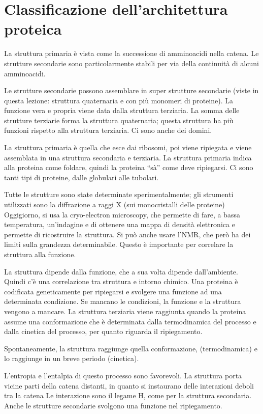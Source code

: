 \chapter{Classificazione dell'architettura proteica}


La struttura primaria è vista come la successione di amminoacidi nella
catena.
Le strutture secondarie sono particolarmente stabili per via della
continuità di alcuni amminoacidi.

Le strutture secondarie possono assemblare in super strutture secondarie
(viste in questa lezione: struttura quaternaria e con più monomeri di
proteine).
La funzione vera e propria viene data dalla struttura terziaria.
La somma delle strutture terziarie forma la struttura quaternaria;
questa struttura ha più funzioni rispetto alla struttura terziaria.
Ci sono anche dei domini.

La struttura primaria è quella che esce dai ribosomi, poi viene
ripiegata e viene assemblata in una struttura secondaria e terziaria.
La struttura primaria indica alla proteina come foldare, quindi la
proteina ``sà'' come deve ripiegarsi.
Ci sono tanti tipi di proteine, dalle globulari alle tubolari.

Tutte le strutture sono state determinate sperimentalmente; gli
strumenti utilizzati sono la diffrazione a raggi X (sui monocristalli
delle proteine)
Oggigiorno, si usa la cryo-electron microscopy, che permette di fare, a
bassa temperatura, un'indagine e di ottenere una mappa di densità
elettronica e permette di ricostruire la struttura.
Si può anche usare l'NMR, che però ha dei limiti sulla grandezza
determinabile.
Questo è importante per correlare la struttura alla funzione.

La struttura dipende dalla funzione, che a sua volta dipende
dall'ambiente. Quindi c'è una correlazione tra struttura e intorno
chimico.
Una proteina è codificata geneticamente per ripiegarsi e svolgere una
funzione ad una determinata condizione. Se mancano le condizioni, la
funzione e la struttura vengono a mancare.
La struttura terziaria viene raggiunta quando la proteina assume una
conformazione che è determinata dalla termodinamica del processo e dalla
cinetica del processo, per quanto riguarda il ripiegamento.

Spontaneamente, la struttura raggiunge quella conformazione,
(termodinamica) e lo raggiunge in un breve periodo (cinetica).

L'entropia e l'entalpia di questo processo sono favorevoli. La struttura
porta vicine parti della catena distanti, in quanto si instaurano delle
interazioni deboli tra la catena Le interazione sono il legame H, come
per la struttura secondaria. Anche le strutture secondarie svolgono una
funzione nel ripiegamento.


